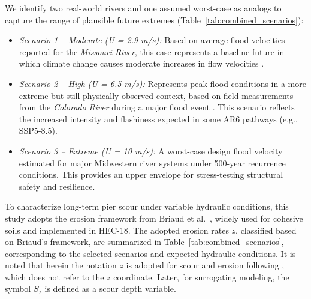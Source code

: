 \documentclass[authoryear,preprint,review,12pt]{elsarticle}
\begin{document}
We identify two real-world rivers and one assumed worst-case as analogs to capture the range of plausible future extremes (Table~\ref{tab:combined_scenarios}):
\begin{itemize}
    \item \textit{Scenario 1 – Moderate (U = 2.9 m/s):} Based on average flood velocities reported for the \textit{Missouri River}, this case represents a baseline future in which climate change causes moderate increases in flow velocities \citep{modot2020tr202017}.
    
    \item \textit{Scenario 2 – High (U = 6.5 m/s):} Represents peak flood conditions in a more extreme but still physically observed context, based on field measurements from the \textit{Colorado River} during a major flood event \citep{Dawson2009}. This scenario reflects the increased intensity and flashiness expected in some AR6 pathways (e.g., SSP5-8.5).
    
    \item \textit{Scenario 3 – Extreme (U = 10 m/s):} A worst-case design flood velocity estimated for major Midwestern river systems under 500-year recurrence conditions. This provides an upper envelope for stress-testing structural safety and resilience.
\end{itemize}

To characterize long-term pier scour under variable hydraulic conditions, this study adopts the erosion framework from Briaud et al.\ \citep{Briaud1999}, widely used for cohesive soils and implemented in HEC-18. The adopted erosion rates $\dot{z}$, classified based on Briaud’s framework, are summarized in Table~\ref{tab:combined_scenarios}, corresponding to the selected scenarios and expected hydraulic conditions. It is noted that herein the notation $z$ is adopted for scour and erosion following \citet{Briaud1999}, which does not refer to the $z$ coordinate. Later, for surrogating modeling, the symbol $S_z$ is defined as a scour depth variable. 

\begin{table}[htbp]
\caption{Scenario-Based Hydraulic Inputs and Scour Predictions (LHS, $N=1000$)}
\label{tab:combined_scenarios}
\centering
\small
{}
\end{table}
\end{document}
